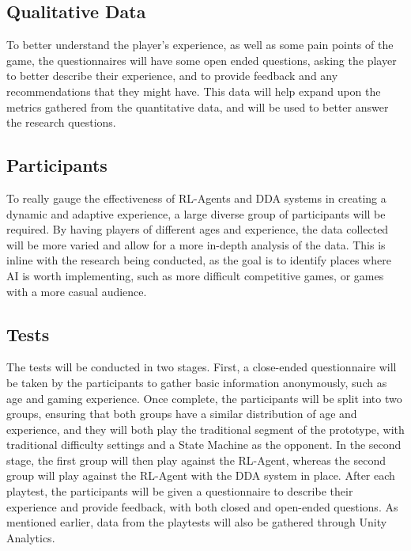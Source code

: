 \begin{spacing}{2.0}
	\subsection{Qualitative Data}

	To better understand the player's experience, as well as some pain points of the game, the questionnaires will have some open ended questions, asking the player to better describe their experience,
	and to provide feedback and any recommendations that they might have. This data will help expand upon the metrics gathered from the quantitative data, and will be used to better answer the research questions.

	\subsection{Participants}

	To really gauge the effectiveness of RL-Agents and DDA systems in creating a dynamic and adaptive experience, a large diverse group of participants will be required.
	By having players of different ages and experience, the data collected will be more varied and allow for a more in-depth analysis of the data. This is inline with the research being conducted, as the goal is to
	identify places where AI is worth implementing, such as more difficult competitive games, or games with a more casual audience.

	\subsection{Tests}
	The tests will be conducted in two stages. First, a close-ended questionnaire will be taken by the participants to gather basic information anonymously, such as age and gaming experience. Once complete,
	the participants will be split into two groups, ensuring that both groups have a similar distribution of age and experience, and they will both play the traditional segment of the prototype,
	with traditional difficulty settings and a State Machine as the opponent. In the second stage, the first group will then play against the RL-Agent, whereas the second group will play against the RL-Agent
	with the DDA system in place. After each playtest, the participants will be given a questionnaire to describe their experience and provide feedback, with both closed and open-ended questions. As mentioned earlier,
	data from the playtests will also be gathered through Unity Analytics.


\end{spacing}
